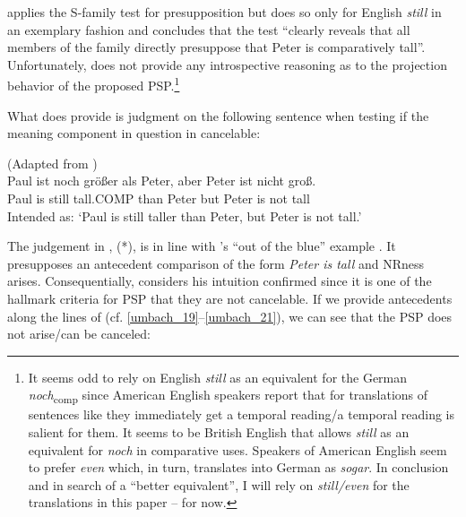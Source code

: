 \documentclass[output=paper]{langsci/langscibook}
\begin{document}
\citeauthor{Hofstetter2013} applies the S-family test \citep{kadmon2001} for presupposition but does so only for English \textit{still} in an exemplary fashion and concludes that the test ``clearly reveals that all members of the family directly presuppose that Peter is comparatively tall''. Unfortunately, \citeauthor{Hofstetter2013} does not provide any introspective reasoning as to the projection behavior of the proposed PSP.{\footnote{It seems odd to rely on English \textit{still} as an equivalent for the German \textit{noch}\textsubscript{comp} since American English speakers report that for translations of sentences like  they immediately get a temporal reading\slash a temporal reading is salient for them. It seems to be British English that allows \textit{still} as an equivalent for \textit{noch} in comparative uses. Speakers of American English seem to prefer \textit{even} which, in turn, translates into German as \textit{sogar}. In conclusion and in search of a ``better equivalent'', I will rely on \textit{still\slash even} for the translations in this paper -- for now.}}

What \citeauthor{Hofstetter2013} does provide is judgment on the following sentence when testing if the meaning component in question in cancelable:

\ea (Adapted from \citealt[27, ex. 2/49]{Hofstetter2013}) \\
\gll {\upshape *} Paul ist noch größer als Peter, aber Peter ist nicht groß.\\
     {}  Paul is still tall.COMP than Peter but Peter is not tall\\
\glt {}    Intended as: {`Paul is still taller than Peter, but Peter is not tall.'} \label{hofstetter_ABER_peter_nicht_gross}
\z

\noindent The judgement in , (*), is in line with \citeauthor{umbach2009a_comp}'s \citeyearpar{umbach2009a_comp} ``out of the blue'' example . It presupposes an antecedent comparison of the form \textit{Peter is tall} and NRness arises. Consequentially, \citet{Hofstetter2013} considers his intuition confirmed since it is one of the hallmark criteria for PSP that they are not cancelable. If we provide antecedents along the lines of \citeauthor{umbach2009a_comp} (cf. \ref{umbach_19}--\ref{umbach_21}), we can see that the PSP does not arise/can be canceled:
\end{document}
